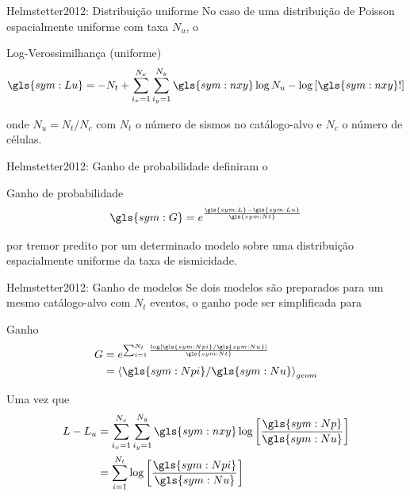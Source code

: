 \documentclass[ucs,8pt]{beamer}
\begin{document}
\begin{frame}{Helmstetter2012: Distribuição uniforme}
	No caso de uma distribuição de Poisson espacialmente uniforme com taxa $N_u$, o
	\begin{block}{Log-Verossimilhança (uniforme)}
		\begin{equation}
			\ensuremath{
				\gls{sym:Lu} = -N_t + 
				\sum_{i_x = 1}^{N_x}\sum_{i_y=1}^{N_y}
				\gls{sym:nxy}\log N_u - \log \left[ \gls{sym:nxy}! \right]
			}
			\label{eq:lu}
		\end{equation}
	\end{block}
	onde $N_u = N_t/N_c$ com $N_t$ o número de sismos no catálogo-alvo e $N_c$ o número de células.
\end{frame}

\begin{frame}{Helmstetter2012: Ganho de probabilidade}
	\citet{kagan_knopoff_1977} definiram o 
	\begin{block}{Ganho de probabilidade}
		\begin{equation}
			\ensuremath{
				\gls{sym:G} = e^{ \frac{\gls{sym:L} - \gls{sym:Lu}}{\gls{sym:Nt}}   }
			}
			\label{eq:gain}
		\end{equation}
	\end{block}
	por tremor predito por um determinado modelo sobre uma distribuição espacialmente uniforme
	da taxa de sismicidade.
\end{frame}

\begin{frame}{Helmstetter2012: Ganho de modelos}
	Se dois modelos são preparados para um mesmo catálogo-alvo com $N_t$ eventos,
	o ganho pode ser simplificada para
	\begin{block}{Ganho}
		\begin{equation}
			\ensuremath{
			\begin{align}
				G & = e^{\sum_{i = 1}^{N_t}
							\frac{\log \left[  \gls{sym:Npi} / \gls{sym:Nu}  \right]}
								 {\gls{sym:Nt}}
					  } \\
				  & = {\langle  \gls{sym:Npi} / \gls{sym:Nu}  \rangle}_{geom}
			\end{align}}
			\label{eq:G}
		\end{equation}	
	\end{block}
	
	Uma vez que 
	\begin{equation}
		\ensuremath{
		\begin{align}
			L - L_u & = \sum_{i_x = 1}^{N_x}\sum_{i_y=1}^{N_y}
					  \gls{sym:nxy}\log \left[ \frac{\gls{sym:Np}}{\gls{sym:Nu}} \right] \\
					& = \sum_{i = 1}^{N_t}\log \left[\frac{\gls{sym:Npi}}{\gls{sym:Nu}} \right]
		\end{align}}
		\label{eq:llu}
	\end{equation}
\end{frame}
\end{document}
